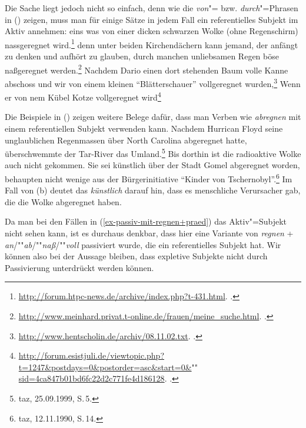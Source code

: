 Die Sache liegt jedoch nicht so einfach, denn wie die \emph{von}"= bzw. \emph{durch}"=Phrasen in () zeigen,
muss man für einige Sätze in jedem Fall ein referentielles Subjekt im Aktiv annehmen:
\eal
\label{bsp-regnen+resultativ-aktiv}
\ex eins was von einer dicken schwarzen Wolke (ohne Regenschirm) nassgeregnet wird.\footnote{
  \url{http://forum.htpc-news.de/archive/index.php?t-431.html}. .
}
\ex denn unter beiden Kirchendächern kann jemand, der anfängt zu denken und aufhört
zu glauben, durch manchen unliebsamen Regen böse naßgeregnet werden.\footnote{
  \url{http://www.meinhard.privat.t-online.de/frauen/meine_suche.html}. .
}
\ex Nachdem Dario einen dort stehenden Baum volle Kanne abschoss und wir von einem kleinen
"`Blätterschauer"' vollgeregnet wurden,\footnote{
\url{http://www.hentscholin.de/archiv/08.11.02.txt}. .
}
\ex Wenn er von nem Kübel Kotze vollgeregnet wird\footnote{%
\href{http://forum.esistjuli.de/viewtopic.php?t=1247&postdays=0&postorder=asc&start=0&sid=4ca847b01bd6fc22d2c771fe4d186128}{http://forum.esistjuli.de/viewtopic.php?t=1247\&postdays=0\&postorder=asc\&start=0\&}""%
\href{http://forum.esistjuli.de/viewtopic.php?t=1247&postdays=0&postorder=asc&start=0&sid=4ca847b01bd6fc22d2c771fe4d186128}{sid=4ca847b01bd6fc22d2c771fe4d186128}. .%
}
\zl

\noindent
Die Beispiele in () zeigen weitere Belege dafür, dass man Verben wie \emph{abregnen} mit einem referentiellen
Subjekt verwenden kann.
\eal
\ex Nachdem Hurrican Floyd seine unglaublichen Regenmassen über North Carolina abgeregnet hatte, überschwemmte der Tar-River das Umland.\footnote{
 taz, 25.09.1999, S.\,5.
}
\ex Bis dorthin ist die radioaktive Wolke auch nicht gekommen. 
    Sie sei künstlich über der Stadt Gomel abgeregnet worden, behaupten nicht wenige aus der Bürgerinitiative "`Kinder von Tschernobyl"'.\footnote{
taz, 12.11.1990, S.\,14.
}
\zl
Im Fall von (b) deutet das \emph{künstlich} darauf hin, dass es menschliche Verursacher gab, die
die Wolke abgeregnet haben.

Da man bei den Fällen in (\ref{ex-passiv-mit-regnen+praed}) das Aktiv"=Subjekt nicht sehen kann,
ist es durchaus denkbar, dass hier eine Variante von \emph{regnen} + \emph{an}/""\emph{ab}/""\emph{naß}/""\emph{voll}
passiviert wurde, die ein referentielles Subjekt hat.
Wir können also bei der Aussage bleiben, dass expletive Subjekte nicht durch Passivierung unterdrückt
werden können.


